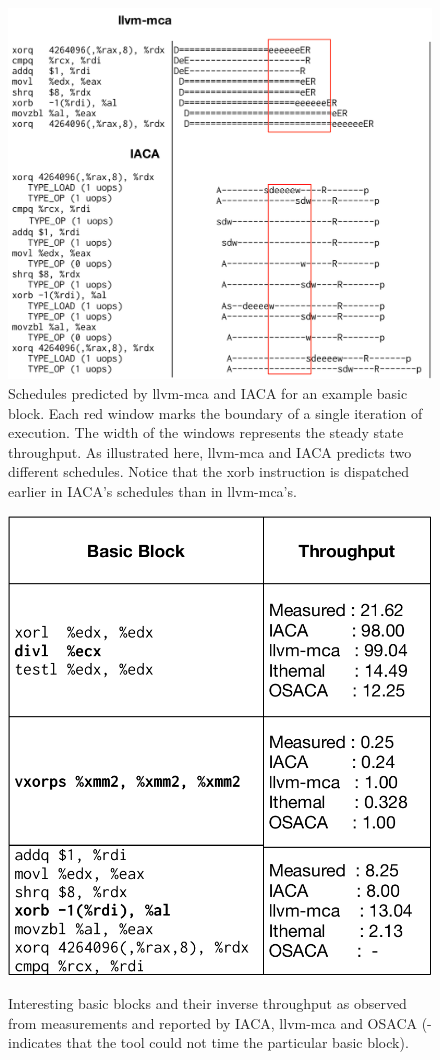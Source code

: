 \begin{figure}[htbp!]
    \includegraphics[width=0.95\columnwidth]{figures/scheduling.pdf}
    \caption{Schedules predicted by llvm-mca and IACA for an example basic block.
    Each red window marks the boundary of a single iteration of execution.
    The width of the windows represents the steady state throughput.
    As illustrated here, llvm-mca and IACA predicts two different schedules.
    Notice that the xorb instruction is dispatched earlier in IACA's schedules than in llvm-mca's. 
    }
    \label{tab:case-study}
\end{figure}

\begin{figure}[htbp!]
    \begin{center}
    \includegraphics[width=0.7\columnwidth]{figures/interesting-examples.pdf}
    \caption{Interesting basic blocks and their inverse throughput as observed from measurements and reported by IACA, llvm-mca and OSACA (- indicates that the tool could not time the particular basic block).}
    \label{tab:case-study}
    \label{fig:schedule}
    \end{center}
\end{figure}

